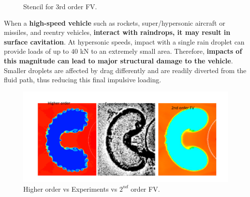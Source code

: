 \documentclass[11pt,sans]{wlscirep} %
\begin{document}
\begin{figure}[H]
\begin{minipage}{0.45\textwidth}
        \caption{Stencil for 3rd order FV.}%
        \label{fig:stencil_3O}
    \end{minipage}
\end{figure} %
\noindent  When a \textbf{high-speed vehicle} such as rockets, super/hypersonic aircraft or missiles, and reentry vehicles, \textbf{interact with raindrops, it may result in surface cavitation}. At hypersonic speeds, impact with a single rain droplet can provide loads of up to $40$ kN to an extremely small area\cite{briggs2023experiments, briggs2024investigation}. Therefore, \textbf{impacts of this magnitude can lead to major structural damage to the vehicle}. Smaller droplets are affected by drag differently and are readily diverted from the fluid path, thus reducing this final impulsive loading. 
\par
\begin{figure}
  \vspace{-10pt}
     \includegraphics[trim={0.4cm 0.4cm 1cm 0cm},clip,scale=0.6]{figures/Heliumbubble.png} 
  \caption{Higher order vs Experiments vs $2^{nd}$ order FV\cite{peyvan2022oscillation}.}  \vspace{-11pt}
 \label{fig:drop_flux}
\end{figure}
\end{document}
